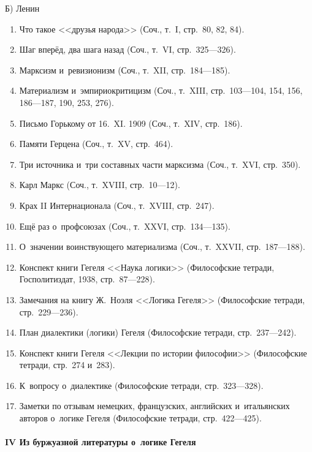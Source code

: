 {\centering Б) Ленин \par}

\begin{enumerate}
\item Что такое <<друзья народа>> (Соч., т.~I, стр.~80, 82, 84).
\item Шаг вперёд, два шага назад (Соч., т.~VI, стр.~325---326).
\item Марксизм и~ревизионизм (Соч., т.~XII, стр.~184---185).
\item Материализм и~эмпириокритицизм (Соч., т.~XIII, стр.~103---104, 154, 156,
186---187, 190, 253, 276).
\item Письмо Горькому от 16.~XI. 1909 (Соч., т.~XIV, стр.~186).
\item Памяти Герцена (Соч., т.~XV, стр.~464).
\item Три источника и~три составных части марксизма (Соч., т.~XVI, стр.~350).
\item Карл Маркс (Соч., т.~XVIII, стр.~10---12).
\item Крах II Интернационала (Соч., т.~XVIII, стр.~247).
\item Ещё раз о~профсоюзах (Соч., т.~XXVI, стр.~134---135).
\item О~значении воинствующего материализма (Соч., т.~XXVII, стр.~187---188).
\item Конспект книги Гегеля <<Наука логики>> (Философские тетради,
Госполитиздат, 1938, стр.~87---228).
\item Замечания на книгу Ж.~Ноэля <<Логика Гегеля>> (Философские тетради,
стр.~229---236).
\item План диалектики (логики) Гегеля (Философские тетради, стр.~237---242).
\item Конспект книги Гегеля <<Лекции по истории философии>>
(Философские тетради, стр.~274 и~283).
\item К~вопросу о~диалектике (Философские тетради, стр.~323---328).
\item Заметки по отзывам немецких, французских, английских и~итальянских
авторов о~логике Гегеля (Философские тетради, стр.~422---425).
\end{enumerate}

\paragraph%
[IV Из буржуазной литературы о~логике Гегеля]%
{IV Из буржуазной литературы о~логике Гегеля}

